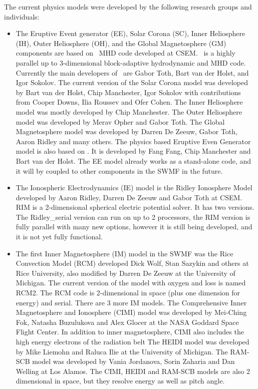 The current physics models were developed by the following research groups
and individuals:
\begin{itemize}
\item
The Eruptive Event generator (EE), Solar Corona (SC), Inner Heliosphere (IH), 
Outer Heliosphere (OH), and the Global Magnetosphere (GM) 
components are based on \BATSRUS\ MHD code developed at CSEM. 
\BATSRUS\ is a highly parallel up to 3-dimensional block-adaptive 
hydrodynamic and MHD code. 
Currently the main developers of \BATSRUS\ are Gabor Toth,
Bart van der Holst, and Igor Sokolov.
The current version of the Solar Corona model was developed
by Bart van der Holst, Chip Manchester, Igor Sokolov with contributions
from Cooper Downs, Ilia Roussev and Ofer Cohen. 
The Inner Heliosphere model was mostly developed by Chip Manchester.
The Outer Heliosphere model was developed by Merav Opher and Gabor Toth. 
The Global Magnetosphere model was developed by 
Darren De Zeeuw, Gabor Toth, Aaron Ridley and many others.
The physics based Eruptive Even Generator model is also based on
\BATSRUS. It is developed by Fang Fang, Chip Manchester and Bart van
der Holst. The EE model already works as a stand-alone code, and
it will by coupled to other components in the SWMF in the future.

\item
The Ionospheric Electrodynamics (IE) model is the Ridley Ionosphere Model
developed by Aaron Ridley, Darren De Zeeuw and Gabor Toth at CSEM.
RIM  is a 2-dimensional spherical electric potential solver.
It has two versions. The Ridley\_serial version can run on up to 2 processors,
the RIM version is fully parallel with many new options, however it is still
being developed, and it is not yet fully functional.

\item
The first Inner Magnetosphere (IM) model in the SWMF was
the Rice Convection Model (RCM) developed Dick Wolf, Stan Sazykin and 
others at Rice University, also modified by Darren De Zeeuw at the
University of Michigan. The current version of the model with oxygen and loss
is named RCM2. The RCM code is 2-dimensional in space 
(plus one dimension for energy) and serial. There are 3 more IM models.
The Comprehensive Inner Magnetosphere and Ionosphere (CIMI) model 
was developed by Mei-Ching Fok, Natasha Buzulukova and 
Alex Glocer at the NASA Goddard Space Flight Center.
In addition to inner magnetosphere, CIMI also includes the high
energy electrons of the radiation belt
The HEIDI model was developed by Mike Liemohn and Raluca Ilie 
at the University of Michigan.
The RAM-SCB model was developed by Vania Jordanova, Sorin Zaharia and
Dan Welling at Los Alamos.
The CIMI, HEIDI and RAM-SCB models are also 2 dimensional
in space, but they resolve energy as well as pitch angle.


\end{itemize}
